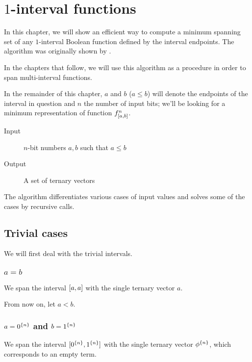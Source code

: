 \chapter{\texorpdfstring{$1$}{1}-interval functions}
\label{chap:1interval}

In this chapter,
we will show an efficient way to compute
a minimum spanning set of any $1$-interval Boolean function
defined by the interval endpoints.
The algorithm was originally shown by
\citet{Schieber2005154}.

In the chapters that follow,
we will use this algorithm as a procedure
in order to span multi-interval functions.

In the remainder of this chapter,
$a$ and $b$ ($a \leq b$) will denote the endpoints
of the interval in question
and $n$ the number of input bits;
we'll be looking for a minimum representation of
function $f^{n}_{[a, b]}$.

\begin{description}
\item[Input] $n$-bit numbers $a, b$ such that $a \leq b$
\item[Output] A set of ternary vectors
\end{description}

The algorithm differentiates various cases
of input values
and solves some of the cases by recursive calls.

\section{Trivial cases}

We will first deal with the trivial intervals.

\subsection{\texorpdfstring{$a = b$}{a = b}}

We span the interval $[a, a]$
with the single ternary vector $a$.

From now on, let $a < b$.

\subsection{\texorpdfstring
{$a = 0^{\{n\}}$}{a = }
and
\texorpdfstring{$b = 1^{\{n\}}$}{b = }
}

We span the interval
$[0^{\{n\}}, 1^{\{n\}}]$
with the single ternary vector $\phi^{\{n\}}$,
which corresponds to an empty term.

